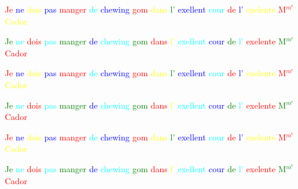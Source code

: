 \documentclass[12pt,a4paper]{article}
\begin{document}
\textcolor{red}{Je} \textcolor{blue}{ne} \textcolor{yellow}{dois} \textcolor{blue}{pas} \textcolor{red}{manger} \textcolor{cyan}{de} \textcolor{blue}{chewing} \textcolor{red}{gom} \textcolor{yellow}{dans} \textcolor{green}{l'} \textcolor{blue}{exellent} \textcolor{cyan}{cour} \textcolor{red}{de} \textcolor{blue}{l'} \textcolor{yellow}{exelente} \textcolor{red}{M$^m^e$} \textcolor{yellow}{Cador}

\textcolor{green}{Je} \textcolor{cyan}{ne} \textcolor{red}{dois} \textcolor{cyan}{pas} \textcolor{green}{manger} \textcolor{blue}{de} \textcolor{cyan}{chewing} \textcolor{green}{gom} \textcolor{red}{dans} \textcolor{yellow}{l'} \textcolor{cyan}{exellent} \textcolor{blue}{cour} \textcolor{green}{de} \textcolor{cyan}{l'} \textcolor{red}{exelente} \textcolor{green}{M$^m^e$} \textcolor{red}{Cador}

\textcolor{red}{Je} \textcolor{blue}{ne} \textcolor{yellow}{dois} \textcolor{blue}{pas} \textcolor{red}{manger} \textcolor{cyan}{de} \textcolor{blue}{chewing} \textcolor{red}{gom} \textcolor{yellow}{dans} \textcolor{green}{l'} \textcolor{blue}{exellent} \textcolor{cyan}{cour} \textcolor{red}{de} \textcolor{blue}{l'} \textcolor{yellow}{exelente} \textcolor{red}{M$^m^e$} \textcolor{yellow}{Cador}

\textcolor{green}{Je} \textcolor{cyan}{ne} \textcolor{red}{dois} \textcolor{cyan}{pas} \textcolor{green}{manger} \textcolor{blue}{de} \textcolor{cyan}{chewing} \textcolor{green}{gom} \textcolor{red}{dans} \textcolor{yellow}{l'} \textcolor{cyan}{exellent} \textcolor{blue}{cour} \textcolor{green}{de} \textcolor{cyan}{l'} \textcolor{red}{exelente} \textcolor{green}{M$^m^e$} \textcolor{red}{Cador}

\textcolor{red}{Je} \textcolor{blue}{ne} \textcolor{yellow}{dois} \textcolor{blue}{pas} \textcolor{red}{manger} \textcolor{cyan}{de} \textcolor{blue}{chewing} \textcolor{red}{gom} \textcolor{yellow}{dans} \textcolor{green}{l'} \textcolor{blue}{exellent} \textcolor{cyan}{cour} \textcolor{red}{de} \textcolor{blue}{l'} \textcolor{yellow}{exelente} \textcolor{red}{M$^m^e$} \textcolor{yellow}{Cador}

\textcolor{green}{Je} \textcolor{cyan}{ne} \textcolor{red}{dois} \textcolor{cyan}{pas} \textcolor{green}{manger} \textcolor{blue}{de} \textcolor{cyan}{chewing} \textcolor{green}{gom} \textcolor{red}{dans} \textcolor{yellow}{l'} \textcolor{cyan}{exellent} \textcolor{blue}{cour} \textcolor{green}{de} \textcolor{cyan}{l'} \textcolor{red}{exelente} \textcolor{green}{M$^m^e$} \textcolor{red}{Cador}
\end{document}
